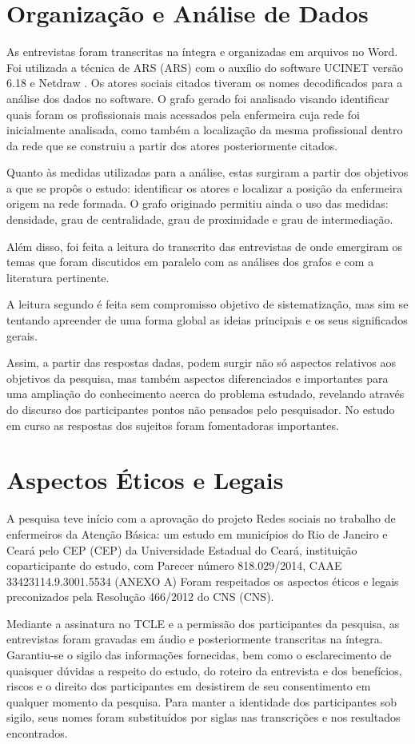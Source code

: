 \section{Organização e Análise de Dados}
As entrevistas foram transcritas na íntegra e organizadas em arquivos no Word. Foi utilizada a técnica de \acrlong{ARS} (\acrshort{ARS}) com o auxílio do software UCINET versão 6.18 e Netdraw \cite{ucinet}. Os atores sociais citados tiveram os nomes decodificados para a análise dos dados no software. O grafo gerado foi analisado visando identificar quais foram os profissionais mais acessados pela enfermeira cuja rede foi inicialmente analisada, como também a localização da mesma profissional dentro da rede que se construiu a partir dos atores posteriormente citados.

Quanto às medidas utilizadas para a análise, estas surgiram a partir dos objetivos a que se propôs o estudo: identificar os atores e localizar a posição da enfermeira origem na rede formada. O grafo originado permitiu ainda o uso das medidas: densidade, 
grau de centralidade, grau de proximidade e grau de intermediação.

Além disso, foi feita a leitura do transcrito das entrevistas de onde emergiram os temas que foram discutidos em paralelo com as análises dos grafos e com a literatura pertinente. 

A leitura segundo \cite{campos2004metodo} é feita sem compromisso objetivo de sistematização, mas sim se tentando apreender de uma forma global as ideias principais e os seus significados gerais.  

Assim, a partir das respostas dadas, podem surgir não só aspectos relativos aos objetivos da pesquisa, mas também aspectos diferenciados e importantes para uma ampliação do conhecimento acerca do problema estudado, revelando através do discurso dos participantes pontos não pensados pelo pesquisador. No estudo em curso as respostas dos sujeitos foram fomentadoras importantes.

\section{Aspectos Éticos e Legais}
A pesquisa teve início com a aprovação do projeto Redes sociais no trabalho de enfermeiros da Atenção Básica: um estudo em municípios do Rio de Janeiro e Ceará pelo \acrlong{CEP} (\acrshort{CEP}) da Universidade Estadual do Ceará, instituição coparticipante do estudo, com Parecer número 818.029/2014, CAAE 33423114.9.3001.5534 (ANEXO A)  Foram respeitados os aspectos éticos e legais preconizados pela Resolução 466/2012 do \acrlong{CNS} (\acrshort{CNS}). 

Mediante a assinatura no \acrshort{TCLE} e a permissão dos participantes da pesquisa, as entrevistas foram gravadas em áudio e posteriormente transcritas na íntegra. Garantiu-se o sigilo das informações fornecidas, bem como o esclarecimento de quaisquer dúvidas a respeito do estudo, do roteiro da entrevista e dos benefícios, riscos e o direito dos participantes em desistirem de seu consentimento em qualquer momento da pesquisa. Para manter a identidade dos participantes sob sigilo, seus nomes foram substituídos por siglas nas transcrições e nos resultados encontrados.
